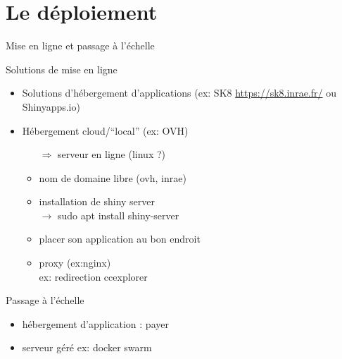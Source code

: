 \documentclass[pdftex,xcolor={table}]{beamer} %
\newcommand{\ra}[0]{$\rightarrow$ }
\newcommand{\Ra}[0]{$\Rightarrow$ }
\begin{document}
\section{Le déploiement}
  \begin{frame}{Mise en ligne et passage à l'échelle}
    \begin{block}{Solutions de mise en ligne}
      \begin{itemize}
        \item Solutions d'hébergement d'applications (ex: SK8 \url{https://sk8.inrae.fr/} ou Shinyapps.io)
        \item Hébergement cloud/``local'' (ex: OVH)
          \begin{itemize}
            \item[\Ra] serveur en ligne (linux ?)
            \item nom de domaine libre (ovh, inrae)
            \item installation de shiny server \\
              \ra sudo apt install shiny-server
            \item placer son application au bon endroit
            \item proxy (ex:nginx)\\
              ex: redirection ccexplorer
          \end{itemize}
      \end{itemize}
    \end{block}
    \begin{block}{Passage à l'échelle}
      \begin{itemize}
        \item hébergement d'application : payer
        \item serveur géré ex: docker swarm
      \end{itemize}
    \end{block}
  \end{frame}
\end{document}
